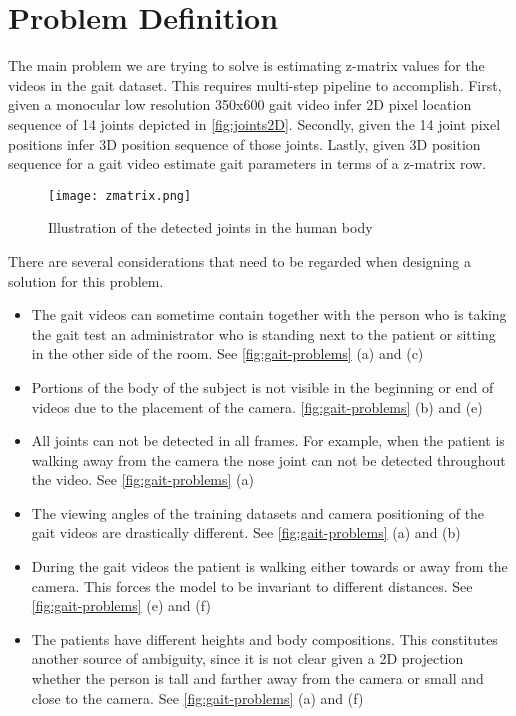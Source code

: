 \section{Problem Definition}

The main problem we are trying to solve is estimating z-matrix values for the videos in the gait dataset. This requires multi-step pipeline to accomplish. First, given a monocular low resolution 350x600 gait video infer 2D pixel location sequence of 14 joints depicted in \autoref{fig:joints2D}. Secondly, given the 14 joint pixel positions infer 3D position sequence of those joints. Lastly, given 3D position sequence for a gait video estimate gait parameters in terms of a z-matrix row.

\begin{figure}[htpb]
    \texttt{[image: zmatrix.png]}
    \caption{Illustration of the detected joints in the human body}
    \label{fig:joints2D}
\end{figure}

There are several considerations that need to be regarded when designing a solution for this problem. 
\begin{itemize}
    \item The gait videos can sometime contain together with the person who is taking the gait test an administrator who is standing next to the patient or sitting in the other side of the room. See \autoref{fig:gait-problems} (a) and (c)
    \item Portions of the body of the subject is not visible in the beginning or end of videos due to the placement of the camera. \autoref{fig:gait-problems} (b) and (e)
    \item All joints can not be detected in all frames. For example, when the patient is walking away from the camera the nose joint can not be detected throughout the video. See \autoref{fig:gait-problems} (a)
    \item The viewing angles of the training datasets and camera positioning of the gait videos are drastically different. See \autoref{fig:gait-problems} (a) and (b)
    \item During the gait videos the patient is walking either towards or away from the camera. This forces the model to be invariant to different distances. See \autoref{fig:gait-problems} (e) and (f)
    \item The patients have different heights and body compositions. This constitutes another source of ambiguity, since it is not clear given a 2D projection whether the person is tall and farther away from the camera or small and close to the camera. See \autoref{fig:gait-problems} (a) and (f)
\end{itemize}


